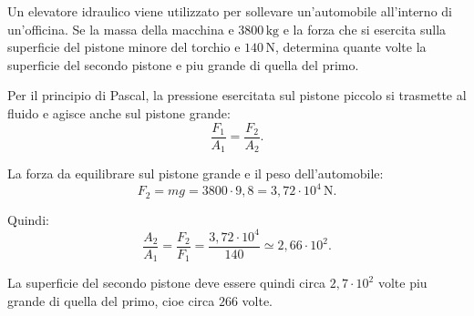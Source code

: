
\begin{esercizio}
Un elevatore idraulico viene utilizzato per sollevare un'automobile all'interno
di un'officina. Se la massa della macchina e $3800\,\mathrm{kg}$ e la forza
che si esercita sulla superficie del pistone minore del torchio e
$140\,\mathrm{N}$, determina quante volte la superficie del secondo pistone e
piu grande di quella del primo.
\end{esercizio}

\begin{soluzione}
Per il principio di Pascal, la pressione esercitata sul pistone piccolo si
trasmette al fluido e agisce anche sul pistone grande:
\[
\frac{F_1}{A_1}=\frac{F_2}{A_2}.
\]

La forza da equilibrare sul pistone grande e il peso dell'automobile:
\[
F_2=mg=3800\cdot 9{,}8
=3{,}72\cdot 10^4\,\mathrm{N}.
\]

Quindi:
\[
\frac{A_2}{A_1}=\frac{F_2}{F_1}
=\frac{3{,}72\cdot 10^4}{140}
\simeq 2{,}66\cdot 10^2.
\]

La superficie del secondo pistone deve essere quindi circa \(2{,}7\cdot 10^2\)
volte piu grande di quella del primo, cioe circa \(266\) volte.
\end{soluzione}
